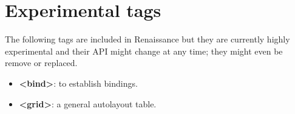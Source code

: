 \section{Experimental tags}

The following tags are included in Renaissance but they are currently
highly experimental and their API might change at any time; they might
even be remove or replaced.
\begin{itemize}
\item {\bf <bind>}: to establish bindings.
\item {\bf <grid>}: a general autolayout table.
\end{itemize}
